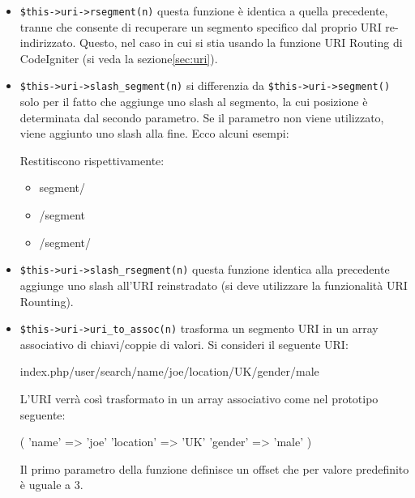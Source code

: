 \begin{itemize}
\item \verb|$this->uri->rsegment(n)| questa funzione è identica a quella precedente, tranne che consente di recuperare un segmento specifico dal proprio URI re-indirizzato. Questo, nel caso in cui si stia usando la funzione URI Routing di CodeIgniter (si veda la sezione\vref{sec:uri}).

\item \verb|$this->uri->slash_segment(n)| si differenzia  da \verb|$this->uri->segment()| solo per il fatto che aggiunge uno slash al segmento, la cui posizione è determinata dal secondo parametro. Se il parametro non viene utilizzato, viene aggiunto uno slash alla fine. Ecco alcuni esempi:


Restitiscono rispettivamente:

\begin{itemize}
\item segment/
\item /segment
\item /segment/
\end{itemize}

\item \verb|$this->uri->slash_rsegment(n)| questa funzione identica alla precedente aggiunge uno slash all'URI reinstradato (si deve utilizzare la funzionalità URI Rounting).

\item \verb|$this->uri->uri_to_assoc(n)| trasforma un segmento URI in un array associativo di chiavi/coppie di valori. Si consideri il seguente URI:

\begin{code}
index.php/user/search/name/joe/location/UK/gender/male
\end{code}

L'URI verrà così trasformato in un array associativo come nel prototipo seguente:

\begin{code}
[array]
(
    'name' => 'joe'
    'location'	=> 'UK'
    'gender'	=> 'male'
)
\end{code}

Il primo parametro della funzione definisce un offset che per valore predefinito è uguale a 3.


\end{itemize}
